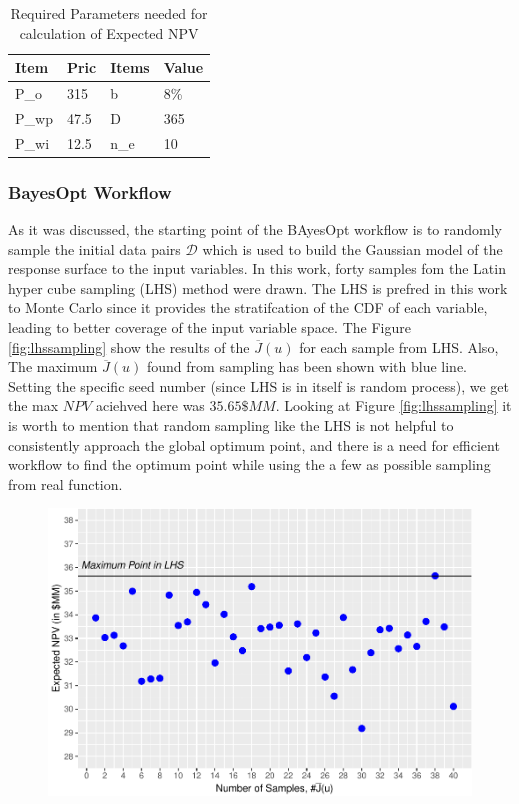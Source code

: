 \documentclass[]{elsarticle} %
\begin{document}
\begin{eqution}
\begin{table}[H]

\caption{\label{tab:npvparam}Required Parameters needed for calculation of Expected NPV}
\centering
\begin{tabu} to 
\hline
Item & Pric & Items & Value\\
\hline
P\_o & 315 & b & 8\%\\
\hline
P\_wp & 47.5 & D & 365\\
\hline
P\_wi & 12.5 & n\_e & 10\\
\hline
\end{tabu}
\end{table}

\hypertarget{bayesopt-workflow}{%
\subsubsection{BayesOpt Workflow}\label{bayesopt-workflow}}

As it was discussed, the starting point of the BAyesOpt workflow is to randomly sample the initial data pairs \(\mathcal{D}\) which is used to build the Gaussian model of the response surface to the input variables. In this work, forty samples fom the Latin hyper cube sampling (LHS) method were drawn. The LHS is prefred in this work to Monte Carlo since it provides the stratifcation of the CDF of each variable, leading to better coverage of the input variable space. The Figure \ref{fig:lhssampling} show the results of the \(\overline{J}(u)\) for each sample from LHS. Also, The maximum \(\overline{J}(u)\) found from sampling has been shown with blue line. Setting the specific seed number (since LHS is in itself is random process), we get the max \(NPV\) aciehved here was \(35.65 \$MM\). Looking at Figure \ref{fig:lhssampling} it is worth to mention that random sampling like the LHS is not helpful to consistently approach the global optimum point, and there is a need for efficient workflow to find the optimum point while using the a few as possible sampling from real function.

\begin{figure}

{\centering \includegraphics[width=468px]{0_Paper1_main_files/figure-latex/lhssampling-1} 

}
\end{figure}
\end{eqution}
\end{document}

